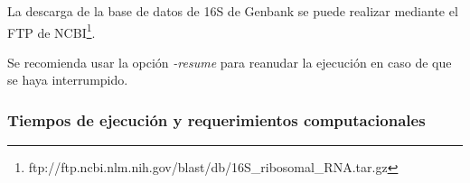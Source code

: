La descarga de la base de datos de 16S de Genbank se puede realizar mediante el FTP de NCBI\footnote{ftp://ftp.ncbi.nlm.nih.gov/blast/db/16S\_ribosomal\_RNA.tar.gz}.

Se recomienda usar la opción \textit{-resume} para reanudar la ejecución en caso de que se haya interrumpido.


\subsubsection{Tiempos de ejecución y requerimientos computacionales}








